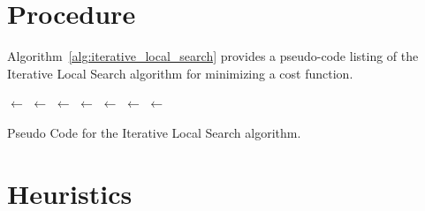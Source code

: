 \documentclass[a4paper, 11pt]{article}
\begin{document}
\section{Procedure}
\label{sec:procedure}
Algorithm~\ref{alg:iterative_local_search} provides a pseudo-code listing of the Iterative Local Search algorithm for minimizing a cost function.


\begin{algorithm}[ht]
	\SetLine
	\KwIn{}
	\KwOut{\Best}
	\Best $\leftarrow$ \ConstructInitialSolution{}\;
	\Best $\leftarrow$ \LocalSearch{}\;
	\SearchHistory $\leftarrow$ \Best\;
	\While{$\neg$ \StopCondition{}} {
		\Candidate $\leftarrow$ \Perturbation{\Best, \SearchHistory}\;
		\Candidate $\leftarrow$ \LocalSearch{\Candidate}\;
		\SearchHistory $\leftarrow$ \Candidate\;
		\If{\AcceptanceCriterion{\Best, \Candidate, \SearchHistory}} {
			\Best $\leftarrow$ \Candidate\;
		}
	}
	\Return{\Best}\;
	\caption{Pseudo Code for the Iterative Local Search algorithm.}
	\label{alg:iterative_local_search}
\end{algorithm}

\section{Heuristics}
\label{sec:heuristics}
\end{document}
